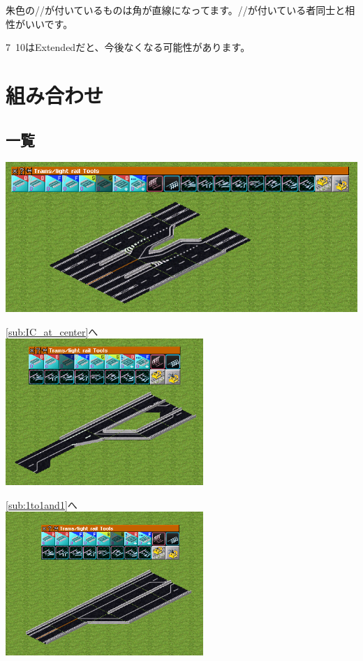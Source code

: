\documentclass{jbook}
\begin{document}
\vspace{5pt}
朱色の//が付いているものは角が直線になってます。//が付いている者同士と相性がいいです。

7~10はExtendedだと、今後なくなる可能性があります。


\newpage

\section{組み合わせ}
\subsection*{一覧}


  \includegraphics[width = 135mm]{picture/20210214-road-1-9.png}

  \ref{sub:IC_at_center}へ\\

  \includegraphics[width = 75mm]{picture/20210214-road-2-8.png}

  \ref{sub:1to1and1}へ\\

  \includegraphics[width = 75mm]{picture/20210214-road-3-6.png}
\end{document}

